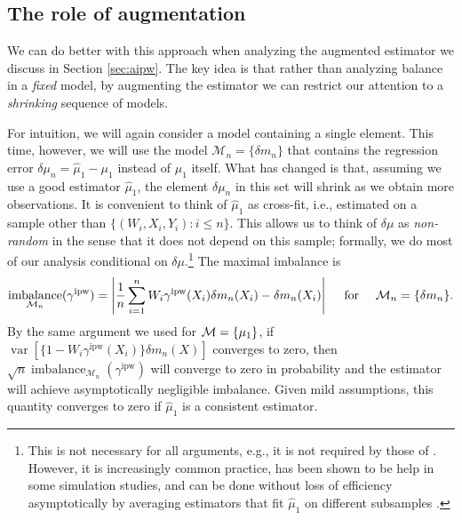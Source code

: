 \documentclass{article}
\DeclarePairedDelimiter\set{\{}{\}}
\theoremstyle{definition}
\newcommand{\calM}{\ensuremath{\mathcal{M}}}
\DeclareMathOperator{\Var}{var}
\newcommand{\ipw}{\text{ipw}}
\newcommand{\dm}{\delta \mu}
\DeclareMathOperator{\imbalance}{imbalance}
\newcommand{\gammaipw}{\ensuremath{\gamma^{\ipw}}}
\newcommand{\model}{\mathcal{M}}
\newcommand{\<}{\langle}
\renewcommand{\>}{\rangle}
\begin{document}
\subsection{The role of augmentation}
\label{sec:role-of-augmentation}
We can do better with this approach when analyzing the augmented estimator we discuss in Section \ref{sec:aipw}.
The key idea is that rather than analyzing balance in a \emph{fixed} model, by augmenting the estimator we can restrict our attention to a \emph{shrinking} sequence of models.

For intuition, we will again consider a model containing a single element. This time, however, we will use the model $\calM_n = \{\delta m_n\}$ that contains the regression error $\dm_n = \hat \mu_1 - \mu_1$ instead of $\mu_1$ itself. What has changed is that, assuming we use a good estimator $\hat \mu_1$, the element $\dm_n$ in this set will shrink as we obtain more observations.
It is convenient to think of $\hat \mu_1$ as cross-fit, i.e., estimated
on a sample other than $\{ (W_i,X_i,Y_i) : i \le n\}$. This allows us to think of $\dm$  as \emph{non-random} in the sense that it does not depend on this sample; formally, we do most of our analysis conditional on $\dm$.\footnote{This is not necessary for all arguments, e.g., it is not required by those of \citet{hirshberg2021augmented}.
However, it is increasingly common practice, has been shown to be help in some simulation studies, and
can be done without loss of efficiency asymptotically by averaging estimators that fit $\hat \mu_1$ on different subsamples
\citep[see, e.g.][]{chernozhukov2018double, schick1986asymptotically, zheng2011cross}.}
The maximal imbalance is
\[
  \imbalance_{\calM_n}(\gammaipw) = \left|\frac{1}{n}\sum_{i=1}^n W_i \gammaipw(X_i) \delta m_n(X_i)-\delta m_n(X_i)\right| \quad \text{ for } \quad \model_n = \set{ \delta m_n}.
\]
By the same argument we used for $\model=\set{\mu_1}$, if $\Var[\{1-W_i\gammaipw(X_i)\}\delta m_n(X)]$ converges to zero, then $\sqrt{n} \imbalance_{\calM_n}(\gammaipw)$ will converge to zero in probability and the estimator will achieve asymptotically negligible imbalance.
Given mild assumptions, this quantity converges to zero if $\hat \mu_1$
is a consistent estimator.\footnotemark
\end{document}
